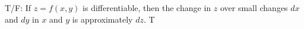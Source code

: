 {T/F: If $z=f(x,y)$ is differentiable, then the change in $z$ over small changes $dx$ and $dy$ in $x$ and $y$ is approximately $dz$.}
{T
}